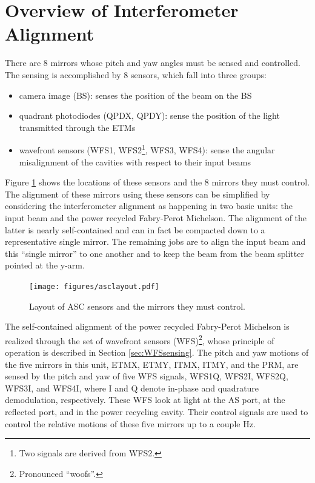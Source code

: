 \section{Overview of Interferometer Alignment}
\label{sec:alignment_overview}

There are 8 mirrors whose pitch and yaw angles must be sensed and controlled. The sensing is accomplished by 8 sensors, which fall into three groups:
\begin{itemize}
\item camera image (BS): senses the position of the beam on the BS \vspace{-10pt}
\item quadrant photodiodes (QPDX, QPDY): sense the position of the light transmitted through the ETMs \vspace{-10pt}
\item wavefront sensors (WFS1, WFS2\footnote{Two signals are derived from WFS2.}, WFS3, WFS4): sense the angular misalignment of the cavities with respect to their input beams
\end{itemize}
Figure \ref{fig:ASCsensors} shows the locations of these sensors and the 8 mirrors they must control.  The alignment of these mirrors using these sensors can be simplified by considering the interferometer alignment as happening in two basic units: the input beam and the power recycled Fabry-Perot Michelson. The alignment of the latter is nearly self-contained and can in fact be compacted down to a representative single mirror. The remaining jobs are to align the input beam and this ``single mirror'' to one another and to keep the beam from the beam splitter pointed at the y-arm.


\begin{figure} 
\begin{centering} 
\texttt{[image: figures/asclayout.pdf]} 
\caption[Layout of ASC sensors and the mirrors they must control]{Layout of ASC sensors and the mirrors they must
 control.}
\label{fig:ASCsensors}
\end{centering}
\end{figure}


The self-contained alignment of the power recycled Fabry-Perot Michelson is realized through the set of wavefront sensors (WFS)\footnote{Pronounced ``woofs''.}, whose principle of operation is described in Section \ref{sec:WFSsensing}. The pitch and yaw motions of the five mirrors in this unit, ETMX, ETMY, ITMX, ITMY, and the PRM, are sensed by the pitch and yaw of five WFS signals, WFS1Q, WFS2I, WFS2Q, WFS3I, and WFS4I, where I and Q denote in-phase and quadrature demodulation, respectively. These WFS look at light at the AS port, at the reflected port, and in the power recycling cavity. Their control signals are used to control the relative motions of these five mirrors up to a couple Hz. 

